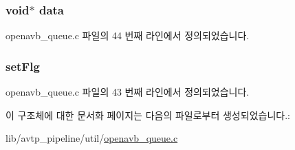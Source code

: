 \subsubsection[{\texorpdfstring{data}{data}}]{\setlength{\rightskip}{0pt plus 5cm}void$\ast$ data}\hypertarget{structopenavb__queue__elem_a735984d41155bc1032e09bece8f8d66d}{}\label{structopenavb__queue__elem_a735984d41155bc1032e09bece8f8d66d}


openavb\+\_\+queue.\+c 파일의 44 번째 라인에서 정의되었습니다.

\subsubsection[{\texorpdfstring{set\+Flg}{setFlg}}]{ set\+Flg}\hypertarget{structopenavb__queue__elem_ae6c344e5ef7cdc07d497b7ed071968a8}{}\label{structopenavb__queue__elem_ae6c344e5ef7cdc07d497b7ed071968a8}


openavb\+\_\+queue.\+c 파일의 43 번째 라인에서 정의되었습니다.



이 구조체에 대한 문서화 페이지는 다음의 파일로부터 생성되었습니다.\+:\begin{DoxyCompactItemize}
\item 
lib/avtp\+\_\+pipeline/util/\hyperlink{openavb__queue_8c}{openavb\+\_\+queue.\+c}\end{DoxyCompactItemize}
